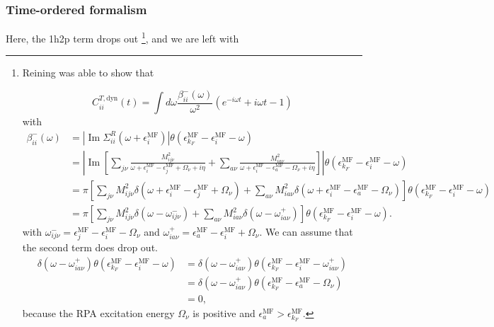 \subsubsection{Time-ordered formalism}
Here, the 1h2p term drops out \footnote{Reining was able to show that 

\begin{equation}
    {C}_{ii}^{T,\text{dyn}}(t)=\int d \omega \frac{\beta_{ii}^{-}(\omega)}{\omega^2}\left(e^{-i \omega t}+i \omega t-1\right)
\end{equation}
with 
\begin{align}
    \beta_{ii}^{-}(\omega)&=\left|\operatorname{Im} \Sigma_{ii}^R\left(\omega+\epsilon_i^{\text{MF}}\right)\right| \theta\left(\epsilon_{k_F}^{\text{MF}}-\epsilon_i^{\text{MF}}-\omega\right)\\
&=\left|\operatorname{Im} \left[ \sum_{j\nu} \frac{M_{ij\nu}^2}{\omega + \epsilon_i^{\text{MF}} - \epsilon_j^{\mathrm{MF}} + \Omega_\nu + i \eta} + \sum_{a\nu} \frac{M_{ia\nu}^2}{\omega + \epsilon_i^{\text{MF}} - \epsilon_a^{\mathrm{MF}} - \Omega_\nu + i \eta} \right] \right| \theta\left(\epsilon_{k_F}^{\text{MF}}-\epsilon_i^{\text{MF}}-\omega\right)\\
&=
\pi
\left[
\sum_{j\nu} M_{ij\nu}^2
\delta\left(\omega+\epsilon_i^{\text{MF}}-\epsilon_j^{\mathrm{MF}}+\Omega_\nu\right)
+
\sum_{a\nu} M_{ia\nu}^2
\delta\left(\omega+\epsilon_i^{\text{MF}}-\epsilon_a^{\mathrm{MF}}-\Omega_\nu\right)
\right]
\theta\left(\epsilon_{k_F}^{\text{MF}}-\epsilon_i^{\text{MF}}-\omega\right)\\
&=
\pi
\left[
\sum_{j\nu}M_{ij\nu}^2
\delta\left(\omega-\omega_{ij\nu}^{-}\right)
+
\sum_{a\nu}M_{ia\nu}^2
\delta\left(\omega-\omega_{ia\nu}^{+}\right)
\right]
\theta\left(\epsilon_{k_F}^{\text{MF}}-\epsilon_i^{\text{MF}}-\omega\right).
\end{align}
with $\omega_{ij\nu}^{-}= \epsilon_j^{\mathrm{MF}} - \epsilon_i^{\text{MF}} - \Omega_\nu$ and $\omega_{ia\nu}^{+} = \epsilon_a^{\mathrm{MF}} - \epsilon_i^{\text{MF}} + \Omega_\nu$.
We can assume that the second term does drop out.
\begin{align}
\delta\left(\omega-\omega_{ia\nu}^{+}\right)
\theta\left(\epsilon_{k_F}^{\text{MF}}-\epsilon_i^{\text{MF}}-\omega\right)
&=
\delta\left(\omega-\omega_{ia\nu}^{+}\right)
\theta\left(\epsilon_{k_F}^{\text{MF}}-\epsilon_i^{\text{MF}}-\omega_{ia\nu}^{+}\right)\\
&= \delta\left(\omega-\omega_{ia\nu}^{+}\right)
\theta\left(\epsilon_{k_F}^{\text{MF}}-\epsilon_a^{\mathrm{MF}}-\Omega_\nu\right)\\
&=0,
\end{align}
because the RPA excitation energy $\Omega_\nu$ is positive and $\epsilon_a^{\mathrm{MF}}>\epsilon_{k_F}^{\text{MF}}$.
}, and we are left with
